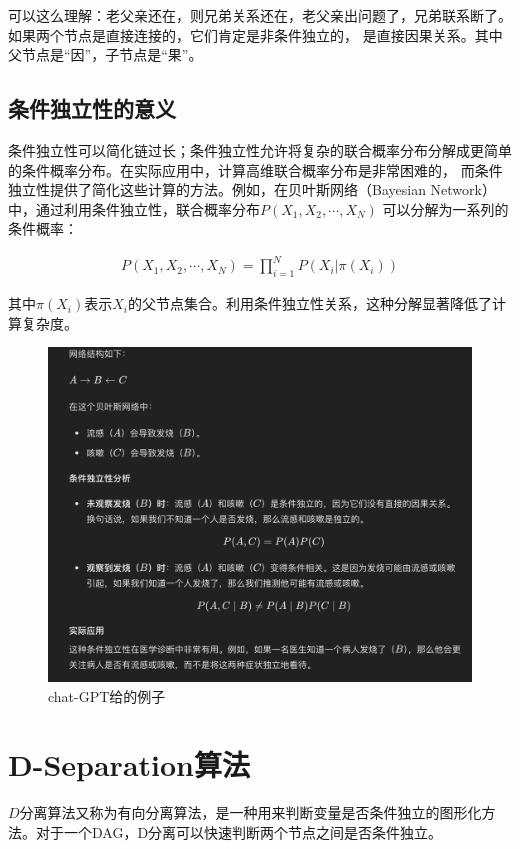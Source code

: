 可以这么理解：老父亲还在，则兄弟关系还在，老父亲出问题了，兄弟联系断了。如果两个节点是直接连接的，它们肯定是非条件独立的，
是直接因果关系。其中父节点是“因”，子节点是“果”。


\subsection*{条件独立性的意义}

条件独立性可以简化链过长；条件独立性允许将复杂的联合概率分布分解成更简单的条件概率分布。在实际应用中，计算高维联合概率分布是非常困难的，
而条件独立性提供了简化这些计算的方法。例如，在贝叶斯网络（Bayesian Network）中，通过利用条件独立性，联合概率分布$P(X_1,X_2,\cdots,X_N)$
可以分解为一系列的条件概率：

\begin{eqnarray}
    P(X_1,X_2,\cdots,X_N)=\prod\limits_{i=1}^{N} P(X_i|\pi(X_i))
\end{eqnarray}

其中$\pi(X_i)$表示$X_i$的父节点集合。利用条件独立性关系，这种分解显著降低了计算复杂度。
\begin{figure}[H]
    \centering
    \includegraphics[scale=0.25]{figures/贝叶斯网络gpt给的例子.png}
    \caption{chat-GPT给的例子}
\end{figure}

\section{D-Separation算法}

$D$分离算法又称为有向分离算法，是一种用来判断变量是否条件独立的图形化方法。对于一个DAG，D分离可以快速判断两个节点之间是否条件独立。

